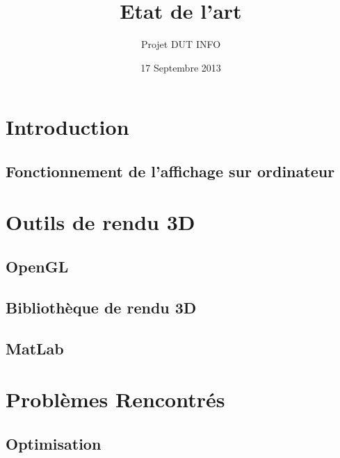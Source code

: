 \documentclass{report}
\title{Etat de l'art}
\author{Projet DUT INFO}
\date{17 Septembre 2013}
\begin{document}
\maketitle

\hypertarget{tableofcontents}{} %
\tableofcontents

\part{Introduction}

\chapter{Fonctionnement de l'affichage sur ordinateur}


\part{Outils de rendu 3D}

\chapter{OpenGL}


\chapter{Bibliothèque de rendu 3D}


\chapter{MatLab}

\part{Problèmes Rencontrés}

\chapter{Optimisation}
\newpage
\end{document}

